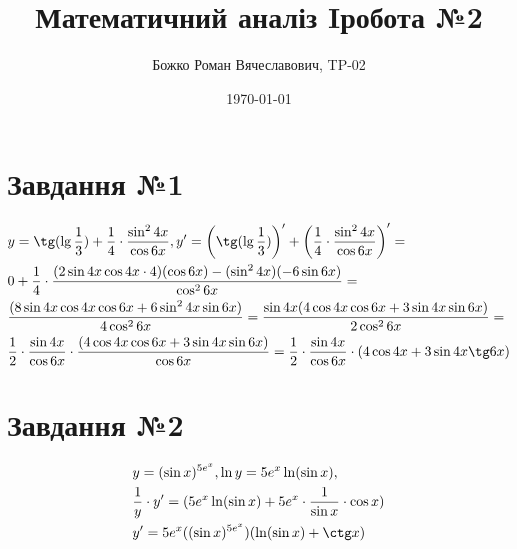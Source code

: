 \documentclass{report}
\begin{document}
\title{Математичний аналіз I робота №2}
\author{Божко Роман Вячеславович, TP-02}
\date{\today}

\maketitle

\section{Завдання №1}
\begin{equation}\begin{split}\label{eq1}
	& y = \tg(\lg\frac{1}{3}) + \frac{1}{4}\cdot\frac{\sin^{2}4x}{\cos6x}, y' = \left(\tg(\lg\frac{1}{3})\right)' + \left(\frac{1}{4}\cdot\frac{\sin^{2}4x}{\cos6x}\right)' =\\
	& 0 + \frac{1}{4}\cdot\frac{(2\sin4x\cos4x \cdot 4)(\cos6x) - (\sin^{2}4x)(-6\sin6x)}{\cos^{2}6x} =\\
	& \frac{(8\sin4x\cos4x\cos6x + 6\sin^{2}4x\sin6x)}{4\cos^{2}6x} = \frac{\sin4x(4\cos4x\cos6x + 3\sin4x\sin6x)}{2\cos^{2}6x} =\\
	& \frac{1}{2} \cdot \frac{\sin4x}{\cos6x} \cdot \frac{(4\cos4x\cos6x + 3\sin4x\sin6x)}{\cos6x} =  \frac{1}{2} \cdot \frac{\sin4x}{\cos6x} \cdot (4\cos4x + 3\sin4x\tg6x)
\end{split}\end{equation}

\section{Завдання №2}
\begin{equation}\label{eq2}\begin{split}
	& y = (\sin x)^{5e^{x}}, \ln y = 5e^{x}\ln(\sin x), \\
	& \frac{1}{y} \cdot y' = (5e^{x}\ln(\sin x) + 5e^{x}\cdot\frac{1}{\sin x}\cdot\cos x)\\
	& y' = 5e^{x}((\sin x)^{5e^{x}})(\ln(\sin x) + \ctg x)
\end{split}\end{equation}
\end{document}
